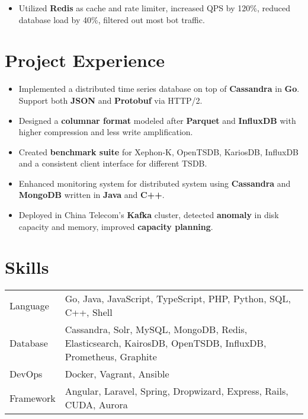 \documentclass[11pt, letterpaper]{simple-cv}
\begin{document}
\begin{itemize}
  \item Utilized \textbf{Redis} as cache and rate limiter, increased QPS by 120\%, reduced database load by 40\%, filtered out most bot traffic.
\end{itemize}

\section{Project Experience}



\begin{itemize}
  \item Implemented a distributed time series database on top of \textbf{Cassandra} in \textbf{Go}. Support both \textbf{JSON} and \textbf{Protobuf} via HTTP/2.
  \item Designed a \textbf{columnar format} modeled after \textbf{Parquet} and \textbf{InfluxDB} with higher compression and less write amplification.
  \item Created \textbf{benchmark suite} for Xephon-K, OpenTSDB, KariosDB, InfluxDB and a consistent client interface for different TSDB.
\end{itemize}


\begin{itemize}
  \item Enhanced monitoring system for distributed system using \textbf{Cassandra} and \textbf{MongoDB} written in \textbf{Java} and \textbf{C++}.
  \item Deployed in China Telecom's \textbf{Kafka} cluster, detected \textbf{anomaly} in disk capacity and memory, improved \textbf{capacity planning}.
\end{itemize}


\section{Skills}
\begin{tabular}{ l l }
 Language &  Go, Java, JavaScript, TypeScript, PHP, Python, SQL, C++, Shell\\
 Database & Cassandra, Solr, MySQL, MongoDB, Redis, Elasticsearch, KairosDB, OpenTSDB, InfluxDB, Prometheus, Graphite\\
 DevOps & Docker, Vagrant, Ansible\\
 Framework & Angular, Laravel, Spring, Dropwizard, Express, Rails, CUDA, Aurora
\end{tabular}

\end{document}
